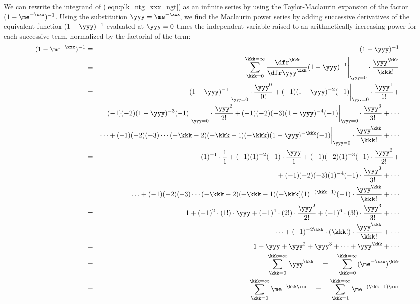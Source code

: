 \documentclass[12pt]{article}
\begin{document}
We can rewrite the integrand of (\ref{eqn:plk_ntg_xxx_ngt}) as an
infinite series by using the Taylor-Maclaurin expansion of the factor
$(1 - \me^{-\xxx})^{-1}$.
Using the substitution $\yyy = \me^{-\xxx}$, we find the Maclaurin
power series by adding successive derivatives of the equivalent
function $(1-\yyy)^{-1}$ evaluated at $\yyy = 0$ times the 
independent variable raised to an arithmetically increasing power 
for each successive term, normalized by the factorial of the term:
\begin{eqnarray}
  (1-\me^{-\xxx})^{-1} & \equiv & (1-\yyy)^{-1} \nonumber \\
  & \equiv & \left. \sum_{\kkk=0}^{\kkk=\infty}
  \frac{\dfr^{\kkk}}{\dfr \yyy^{\kkk}} (1 - \yyy)^{-1} \right|_{\yyy=0}
  \cdot \frac{\yyy^{\kkk}}{\kkk!} \nonumber \\
  & = & 
  (1 - \yyy)^{-1} \bigg|_{\yyy=0} \cdot \frac{\yyy^{0}}{0!} + 
  (-1)(1 - \yyy)^{-2}(-1) \bigg|_{\yyy=0} \cdot \frac{\yyy^{1}}{1!} + \nonumber \\
  & & 
  {} (-1)(-2)(1 - \yyy)^{-3}(-1) \bigg|_{\yyy=0} \cdot \frac{\yyy^{2}}{2!} + 
  (-1)(-2)(-3)(1 - \yyy)^{-4}(-1) \bigg|_{\yyy=0} \cdot \frac{\yyy^{3}}{3!} + \cdots \nonumber \\ 
  & & 
  \cdots + 
  (-1)(-2)(-3) \cdots (-\kkk - 2)(-\kkk - 1)(-\kkk) (1 - \yyy)^{-\kkk}(-1) \bigg|_{\yyy=0} \cdot \frac{\yyy^{\kkk}}{\kkk!} + \cdots \nonumber \\
  & = & 
  (1)^{-1} \cdot \frac{1}{1} + 
  (-1)(1)^{-2}(-1) \cdot \frac{\yyy}{1} + 
  (-1)(-2)(1)^{-3}(-1) \cdot \frac{\yyy^{2}}{2!} + \nonumber \\
  & & 
  {} + (-1)(-2)(-3)(1)^{-4}(-1) \cdot \frac{\yyy^{3}}{3!} + \cdots \nonumber \\
  & & 
  \ldots + (-1)(-2)(-3) \cdots (-\kkk - 2)(-\kkk - 1)(-\kkk) (1)^{-(\kkk+1)} (-1) \cdot \frac{\yyy^{\kkk}}{\kkk!} + \cdots
  \nonumber \\
  & = & 
  1 + 
  (-1)^{2} \cdot (1!) \cdot \yyy + 
  (-1)^{4} \cdot (2!) \cdot \frac{\yyy^{2}}{2!} + 
  (-1)^{6} \cdot (3!) \cdot \frac{\yyy^{3}}{3!} + \cdots \nonumber \\
  & & 
  \cdots + (-1)^{-2\kkk} \cdot (\kkk!) \cdot \frac{\yyy^{\kkk}}{\kkk!} + \cdots \nonumber \\
  & = & 
  1 + \yyy + \yyy^{2} + \yyy^{3} + \cdots + \yyy^{\kkk} + \cdots \nonumber \\
  & = & 
  \sum_{\kkk=0}^{\kkk=\infty} \yyy^{\kkk} \quad = \quad \sum_{\kkk=0}^{\kkk=\infty} (\me^{-\xxx})^{\kkk} \nonumber \\  
  & = & 
  \sum_{\kkk=0}^{\kkk=\infty} \me^{-\kkk\xxx} \quad = \quad \sum_{\kkk=1}^{\kkk=\infty} \me^{-(\kkk - 1)\xxx}
\label{eqn:tyl_mcl_srs}
\end{eqnarray}
\end{document}
